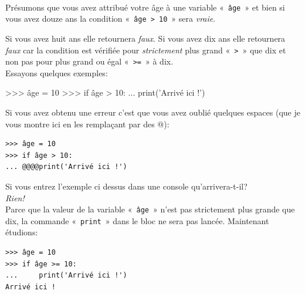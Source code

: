 \\


Présumons que vous avez attribué votre âge à une variable «~\texttt{âge}~»  et bien si vous avez douze ans la condition «~\texttt{âge > 10}~» sera \emph{vraie}.

Si vous avez huit ans elle retournera \emph{faux}.
Si vous avez dix ans elle retournera \emph{faux} car la condition est vérifiée pour \emph{strictement} plus grand «~\texttt{>}~»  que dix et non pas pour plus grand ou égal «~\texttt{>=}~» à dix.\\

Essayons quelques exemples:

\begin{Verbatim*}[frame=single,rulecolor=\color{green}, label=à taper avec attention]
>>> âge = 10
>>> if âge > 10:
...     print('Arrivé ici !')
\end{Verbatim*}

Si vous avez obtenu une erreur c'est que vous avez oublié quelques espaces (que je vous montre ici en les remplaçant par des @):

\begin{Verbatim}[frame=single,rulecolor=\color{gray}, label=ne pas saisir]
>>> âge = 10
>>> if âge > 10:
... @@@@print('Arrivé ici !')
\end{Verbatim}

Si vous entrez l'exemple ci dessus dans une console qu'arrivera-t-il?\\

\emph{Rien!}\\

Parce que la valeur de la variable «~\texttt{âge}~» n'est pas strictement plus grande que dix, la commande «~\texttt{print}~» dans le bloc ne sera pas lancée. Maintenant étudions:

\begin{Verbatim}[frame=single,rulecolor=\color{green}, label=à taper avec attention]
>>> âge = 10
>>> if âge >= 10:
...     print('Arrivé ici !')
Arrivé ici !
\end{Verbatim}

